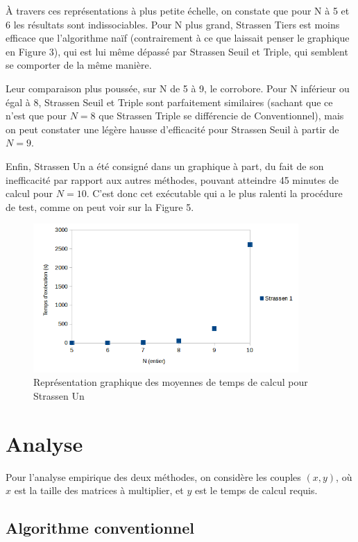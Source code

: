 \documentclass[10pt,a4paper]{article}
\begin{document}
À travers ces représentations à plus petite échelle, on constate que pour N à 5 et 6 les résultats sont indissociables. Pour N plus grand, Strassen Tiers est moins efficace que l'algorithme naïf (contrairement à ce que laissait penser le graphique en Figure 3), qui est lui même dépassé par Strassen Seuil et Triple, qui semblent se comporter de la même manière.

Leur comparaison plus poussée, sur N de 5 à 9, le corrobore. Pour N inférieur ou égal à 8, Strassen Seuil et Triple sont parfaitement similaires (sachant que ce n'est que pour $ N = 8 $ que Strassen Triple se différencie de Conventionnel), mais on peut constater une légère hausse d'efficacité pour Strassen Seuil à partir de $ N = 9 $.

Enfin, Strassen Un a été consigné dans un graphique à part, du fait de son inefficacité par rapport aux autres méthodes, pouvant atteindre 45 minutes de calcul pour $ N = 10 $. C'est donc cet exécutable qui a le plus ralenti la procédure de test, comme on peut voir sur la Figure 5.

\newpage

\begin{figure}[h!]
	\centering
	\includegraphics[width=0.9\textwidth]{spreadsheet/graph4}
	\caption{Représentation graphique des moyennes de temps de calcul pour Strassen Un}
\end{figure}

\newpage

\section{Analyse}

Pour l'analyse empirique des deux méthodes, on considère les couples $ (x,y) $, où $ x $ est la taille des matrices à multiplier, et $ y $ est le temps de calcul requis.

\subsection{Algorithme conventionnel}
\end{document}
